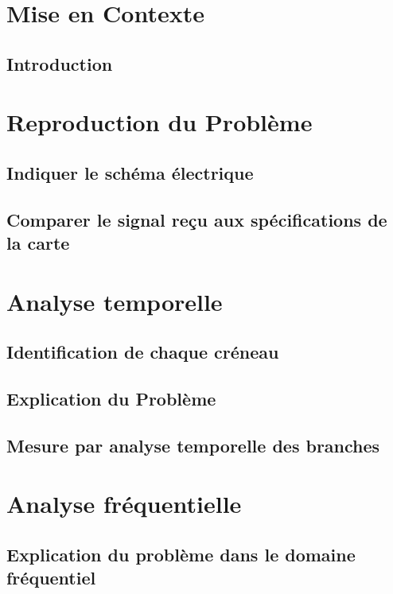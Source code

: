 \documentclass[DIV=15,paper=letter,titlepage=true,fontsize=12pt,headings=normal,captions=nooneline]{scrartcl}
\begin{document}

\newpage
\renewcommand*\contentsname{Table des Matières}
\tableofcontents
\newpage

\setcounter{page}{0}

 \section{Mise en Contexte} %
 \subsection{Introduction}
 
 \FloatBarrier

\section{Reproduction du Problème}
\subsection{Indiquer le schéma électrique}

\FloatBarrier
\subsection{Comparer le signal reçu aux spécifications de la carte}

\FloatBarrier

\section{Analyse temporelle}
\subsection{Identification de chaque créneau}

\FloatBarrier
\subsection{Explication du Problème}

\FloatBarrier
\subsection{Mesure par analyse temporelle des branches}

\FloatBarrier


\section{Analyse fréquentielle}
\subsection{Explication du problème dans le domaine fréquentiel}

\FloatBarrier
\end{document}
